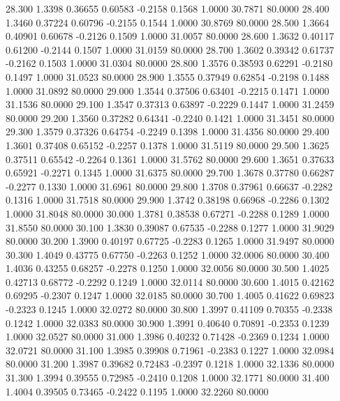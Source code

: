   28.300   1.3398   0.36655   0.60583  -0.2158   0.1568   1.0000  30.7871  80.0000
  28.400   1.3460   0.37224   0.60796  -0.2155   0.1544   1.0000  30.8769  80.0000
  28.500   1.3664   0.40901   0.60678  -0.2126   0.1509   1.0000  31.0057  80.0000
  28.600   1.3632   0.40117   0.61200  -0.2144   0.1507   1.0000  31.0159  80.0000
  28.700   1.3602   0.39342   0.61737  -0.2162   0.1503   1.0000  31.0304  80.0000
  28.800   1.3576   0.38593   0.62291  -0.2180   0.1497   1.0000  31.0523  80.0000
  28.900   1.3555   0.37949   0.62854  -0.2198   0.1488   1.0000  31.0892  80.0000
  29.000   1.3544   0.37506   0.63401  -0.2215   0.1471   1.0000  31.1536  80.0000
  29.100   1.3547   0.37313   0.63897  -0.2229   0.1447   1.0000  31.2459  80.0000
  29.200   1.3560   0.37282   0.64341  -0.2240   0.1421   1.0000  31.3451  80.0000
  29.300   1.3579   0.37326   0.64754  -0.2249   0.1398   1.0000  31.4356  80.0000
  29.400   1.3601   0.37408   0.65152  -0.2257   0.1378   1.0000  31.5119  80.0000
  29.500   1.3625   0.37511   0.65542  -0.2264   0.1361   1.0000  31.5762  80.0000
  29.600   1.3651   0.37633   0.65921  -0.2271   0.1345   1.0000  31.6375  80.0000
  29.700   1.3678   0.37780   0.66287  -0.2277   0.1330   1.0000  31.6961  80.0000
  29.800   1.3708   0.37961   0.66637  -0.2282   0.1316   1.0000  31.7518  80.0000
  29.900   1.3742   0.38198   0.66968  -0.2286   0.1302   1.0000  31.8048  80.0000
  30.000   1.3781   0.38538   0.67271  -0.2288   0.1289   1.0000  31.8550  80.0000
  30.100   1.3830   0.39087   0.67535  -0.2288   0.1277   1.0000  31.9029  80.0000
  30.200   1.3900   0.40197   0.67725  -0.2283   0.1265   1.0000  31.9497  80.0000
  30.300   1.4049   0.43775   0.67750  -0.2263   0.1252   1.0000  32.0006  80.0000
  30.400   1.4036   0.43255   0.68257  -0.2278   0.1250   1.0000  32.0056  80.0000
  30.500   1.4025   0.42713   0.68772  -0.2292   0.1249   1.0000  32.0114  80.0000
  30.600   1.4015   0.42162   0.69295  -0.2307   0.1247   1.0000  32.0185  80.0000
  30.700   1.4005   0.41622   0.69823  -0.2323   0.1245   1.0000  32.0272  80.0000
  30.800   1.3997   0.41109   0.70355  -0.2338   0.1242   1.0000  32.0383  80.0000
  30.900   1.3991   0.40640   0.70891  -0.2353   0.1239   1.0000  32.0527  80.0000
  31.000   1.3986   0.40232   0.71428  -0.2369   0.1234   1.0000  32.0721  80.0000
  31.100   1.3985   0.39908   0.71961  -0.2383   0.1227   1.0000  32.0984  80.0000
  31.200   1.3987   0.39682   0.72483  -0.2397   0.1218   1.0000  32.1336  80.0000
  31.300   1.3994   0.39555   0.72985  -0.2410   0.1208   1.0000  32.1771  80.0000
  31.400   1.4004   0.39505   0.73465  -0.2422   0.1195   1.0000  32.2260  80.0000
